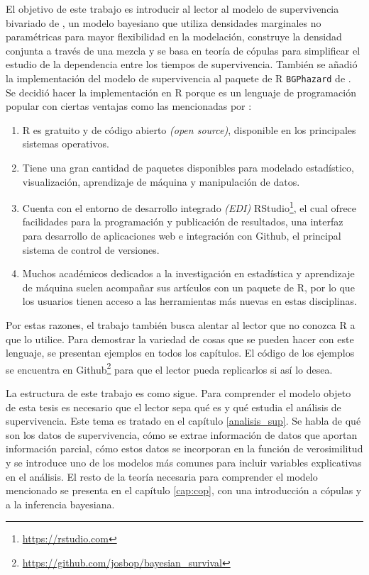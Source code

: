 \documentclass[11pt,a4paper]{article}
\begin{document}
El objetivo de este trabajo es introducir al lector al modelo de supervivencia bivariado de \citet{nieto}, un modelo bayesiano que utiliza densidades marginales no paramétricas para mayor flexibilidad en la modelación, construye la densidad conjunta a través de una mezcla y se basa en teoría de cópulas para simplificar el estudio de la dependencia entre los tiempos de supervivencia. También se añadió la implementación del modelo de supervivencia al paquete de R \texttt{BGPhazard} de \citet{bgphazard}. Se decidió hacer la implementación en R porque es un lenguaje de programación popular con ciertas ventajas como las mencionadas por \citet{advanced_r}:
\begin{enumerate}
\item R es gratuito y de código abierto \textit{(open source)}, disponible en los principales sistemas operativos.
\item Tiene una gran cantidad de paquetes disponibles para modelado estadístico, visualización, aprendizaje de máquina y manipulación de datos.
\item Cuenta con el entorno de desarrollo integrado \textit{(EDI)} RStudio\footnote{\url{https://rstudio.com}}, el cual ofrece facilidades para la programación y publicación de resultados, una interfaz para desarrollo de aplicaciones web e integración con Github, el principal sistema de control de versiones.
\item Muchos académicos dedicados a la investigación en estadística y aprendizaje de máquina suelen acompañar sus artículos con un paquete de R, por lo que los usuarios tienen acceso a las herramientas más nuevas en estas disciplinas.
\end{enumerate}
Por estas razones, el trabajo también busca alentar al lector que no conozca R a que lo utilice. Para demostrar la variedad de cosas que se pueden hacer con este lenguaje, se presentan ejemplos en todos los capítulos. El código de los ejemplos se encuentra en Github\footnote{\url{https://github.com/josbop/bayesian_survival}} para que el lector pueda replicarlos si así lo desea.

La estructura de este trabajo es como sigue. Para comprender el modelo objeto de esta tesis \citep{nieto} es necesario que el lector sepa qué es y qué estudia el análisis de supervivencia. Este tema es tratado en el capítulo \ref{analisis_sup}. Se habla de qué son los datos de supervivencia, cómo se extrae información de datos que aportan información parcial, cómo estos datos se incorporan en la función de verosimilitud y se introduce uno de los modelos más comunes para incluir variables explicativas en el análisis. El resto de la teoría necesaria para comprender el modelo mencionado se presenta en el capítulo \ref{cap:cop}, con una introducción a cópulas y a la inferencia bayesiana.
\end{document}
